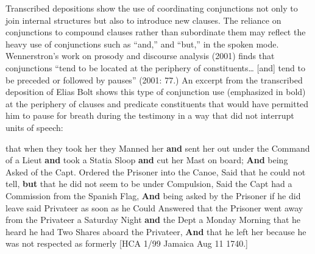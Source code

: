 \begin{styleStandard}
Transcribed depositions show the use of coordinating conjunctions not only to join internal structures but also to introduce new clauses. The reliance on conjunctions to compound clauses rather than subordinate them may reflect the heavy use of conjunctions such as “and,” and “but,” in the spoken mode. Wennerstron’s work on prosody and discourse analysis (2001) finds that conjunctions “tend to be located at the periphery of constituents… [and] tend to be preceded or followed by pauses” (2001: 77.) An excerpt from the transcribed deposition of Elias Bolt shows this type of conjunction use (emphasized in bold) at the periphery of clauses and predicate constituents that would have permitted him to pause for breath during the testimony in a way that did not interrupt units of speech:
\end{styleStandard}

\begin{styleStandard}
that when they took her they Manned her \textbf{and} sent her out under the Command of a Lieut \textbf{and} took a Statia Sloop \textbf{and} cut her Mast on board; \textbf{And} being Asked of the Capt. Ordered the Prisoner into the Canoe, Said that he could not tell, \textbf{but} that he did not seem to be under Compulsion, Said the Capt had a Commission from the Spanish Flag, \textbf{And} being asked by the Prisoner if he did leave said Privateer as soon as he Could Answered that the Prisoner went away from the Privateer a Saturday Night\textbf{ and} the Dept a Monday Morning that he heard he had Two Shares aboard the Privateer, \textbf{And} that he left her because he was not respected as formerly [HCA 1/99 Jamaica Aug 11 1740.]
\end{styleStandard}

